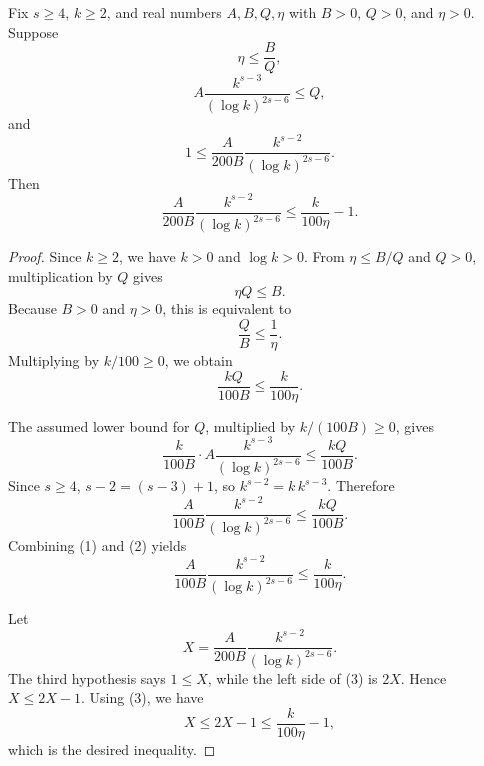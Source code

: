 \begin{helper}
Fix \(s\ge4\), \(k\ge2\), and real numbers \(A,B,Q,\eta\) with
\(B>0\), \(Q>0\), and \(\eta>0\).  Suppose
\[
  \eta\le \frac{B}{Q},
\]
\[
  A\frac{k^{s-3}}{(\log k)^{2s-6}}\le Q,
\]
and
\[
  1\le
  \frac{A}{200B}\frac{k^{s-2}}{(\log k)^{2s-6}}.
\]
Then
\[
  \frac{A}{200B}\frac{k^{s-2}}{(\log k)^{2s-6}}
  \le \frac{k}{100\eta}-1.
\]
\end{helper}
\begin{proof}
Since \(k\ge2\), we have \(k>0\) and \(\log k>0\).  From
\(\eta\le B/Q\) and \(Q>0\), multiplication by \(Q\) gives
\[
  \eta Q\le B.
\]
Because \(B>0\) and \(\eta>0\), this is equivalent to
\[
  \frac{Q}{B}\le \frac1\eta.
\]
Multiplying by \(k/100\ge0\), we obtain
\[
  \frac{kQ}{100B}\le \frac{k}{100\eta}. \tag{1}
\]

The assumed lower bound for \(Q\), multiplied by \(k/(100B)\ge0\), gives
\[
  \frac{k}{100B}\cdot
  A\frac{k^{s-3}}{(\log k)^{2s-6}}
  \le \frac{kQ}{100B}.
\]
Since \(s\ge4\), \(s-2=(s-3)+1\), so \(k^{s-2}=k\,k^{s-3}\).  Therefore
\[
  \frac{A}{100B}\frac{k^{s-2}}{(\log k)^{2s-6}}
  \le \frac{kQ}{100B}. \tag{2}
\]
Combining (1) and (2) yields
\[
  \frac{A}{100B}\frac{k^{s-2}}{(\log k)^{2s-6}}
  \le \frac{k}{100\eta}. \tag{3}
\]

Let
\[
  X=\frac{A}{200B}\frac{k^{s-2}}{(\log k)^{2s-6}}.
\]
The third hypothesis says \(1\le X\), while the left side of (3) is \(2X\).
Hence \(X\le 2X-1\).  Using (3), we have
\[
  X\le 2X-1
  \le \frac{k}{100\eta}-1,
\]
which is the desired inequality.
\end{proof}
